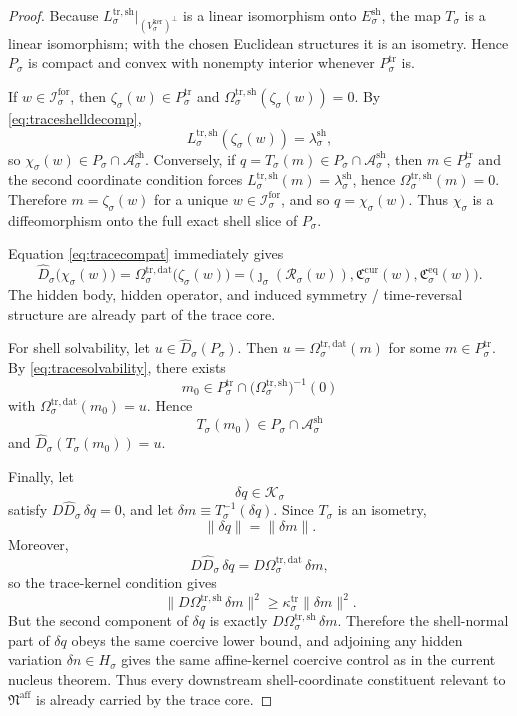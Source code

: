 \documentclass[11pt]{article}
\newcommand{\AffineNucleus}{\mathfrak N^{\mathrm{aff}}}
\newcommand{\ForSpace}[1]{\mathcal I_{#1}^{\mathrm{for}}}
\newcommand{\Reduction}[1]{\mathcal R_{#1}}
\newcommand{\CurrentCarrier}[1]{\mathfrak C_{#1}^{\mathrm{cur}}}
\newcommand{\EqCarrier}[1]{\mathfrak C_{#1}^{\mathrm{eq}}}
\newcommand{\GapSpace}[1]{H_{#1}}
\newcommand{\TraceBody}[1]{P_{#1}^{\mathrm{tr}}}
\newcommand{\TraceDataMap}[1]{\Omega_{#1}^{\mathrm{tr,dat}}}
\newcommand{\TraceShellMap}[1]{\Omega_{#1}^{\mathrm{tr,sh}}}
\newcommand{\TraceEmbed}[1]{\zeta_{#1}}
\newcommand{\TraceShellLin}[1]{L_{#1}^{\mathrm{tr,sh}}}
\newcommand{\ShellKer}[1]{V_{#1}^{\mathrm{ker}}}
\newcommand{\ShellNormal}[1]{E_{#1}^{\mathrm{sh}}}
\newcommand{\ShellOffset}[1]{\lambda_{#1}^{\mathrm{sh}}}
\newcommand{\CoordSpace}[1]{\mathcal K_{#1}}
\newcommand{\CoordBody}[1]{P_{#1}}
\newcommand{\CoordIso}[1]{T_{#1}}
\newcommand{\AffineData}[1]{\widehat D_{#1}}
\newcommand{\ShellAffine}[1]{\mathcal A_{#1}^{\mathrm{sh}}}
\newcommand{\ShellEmbed}[1]{\chi_{#1}}
\begin{document}
\begin{proof}
Because \(\TraceShellLin{\sigma}\big|_{(\ShellKer{\sigma})^{\perp}}\) is a linear isomorphism onto \(\ShellNormal{\sigma}\), the map \(\CoordIso{\sigma}\) is a linear isomorphism; with the chosen Euclidean structures it is an isometry. Hence \(\CoordBody{\sigma}\) is compact and convex with nonempty interior whenever \(\TraceBody{\sigma}\) is.

If \(w\in\ForSpace{\sigma}\), then \(\TraceEmbed{\sigma}(w)\in\TraceBody{\sigma}\) and \(\TraceShellMap{\sigma}(\TraceEmbed{\sigma}(w))=0\). By \eqref{eq:traceshelldecomp},
\[
\TraceShellLin{\sigma}(\TraceEmbed{\sigma}(w))
=
\ShellOffset{\sigma},
\]
so \(\ShellEmbed{\sigma}(w)\in\CoordBody{\sigma}\cap\ShellAffine{\sigma}\). Conversely, if \(q=\CoordIso{\sigma}(m)\in\CoordBody{\sigma}\cap\ShellAffine{\sigma}\), then \(m\in\TraceBody{\sigma}\) and the second coordinate condition forces \(\TraceShellLin{\sigma}(m)=\ShellOffset{\sigma}\), hence \(\TraceShellMap{\sigma}(m)=0\). Therefore \(m=\TraceEmbed{\sigma}(w)\) for a unique \(w\in\ForSpace{\sigma}\), and so \(q=\ShellEmbed{\sigma}(w)\). Thus \(\ShellEmbed{\sigma}\) is a diffeomorphism onto the full exact shell slice of \(\CoordBody{\sigma}\).

Equation \eqref{eq:tracecompat} immediately gives
\[
\AffineData{\sigma}\bigl(\ShellEmbed{\sigma}(w)\bigr)
=
\TraceDataMap{\sigma}\bigl(\TraceEmbed{\sigma}(w)\bigr)
=
\bigl(
\jmath_{\sigma}(\Reduction{\sigma}(w)),
\CurrentCarrier{\sigma}(w),
\EqCarrier{\sigma}(w)
\bigr).
\]
The hidden body, hidden operator, and induced symmetry / time-reversal structure are already part of the trace core.

For shell solvability, let \(u\in\AffineData{\sigma}(\CoordBody{\sigma})\). Then \(u=\TraceDataMap{\sigma}(m)\) for some \(m\in\TraceBody{\sigma}\). By \eqref{eq:tracesolvability}, there exists
\[
m_{0}\in\TraceBody{\sigma}\cap
\bigl(\TraceShellMap{\sigma}\bigr)^{-1}(0)
\]
with \(\TraceDataMap{\sigma}(m_{0})=u\). Hence
\[
\CoordIso{\sigma}(m_{0})\in\CoordBody{\sigma}\cap\ShellAffine{\sigma}
\]
and \(\AffineData{\sigma}(\CoordIso{\sigma}(m_{0}))=u\).

Finally, let
\[
\delta q\in\CoordSpace{\sigma}
\]
satisfy \(D\AffineData{\sigma}\,\delta q=0\), and let \(\delta m\equiv\CoordIso{\sigma}^{-1}(\delta q)\). Since \(\CoordIso{\sigma}\) is an isometry,
\[
\|\delta q\|=\|\delta m\|.
\]
Moreover,
\[
D\AffineData{\sigma}\,\delta q
=
D\TraceDataMap{\sigma}\,\delta m,
\]
so the trace-kernel condition gives
\[
\bigl\|
D\TraceShellMap{\sigma}\,\delta m
\bigr\|^{2}
\ge
\kappa_{\sigma}^{\mathrm{tr}}\|\delta m\|^{2}.
\]
But the second component of \(\delta q\) is exactly \(D\TraceShellMap{\sigma}\,\delta m\). Therefore the shell-normal part of \(\delta q\) obeys the same coercive lower bound, and adjoining any hidden variation \(\delta n\in\GapSpace{\sigma}\) gives the same affine-kernel coercive control as in the current nucleus theorem. Thus every downstream shell-coordinate constituent relevant to \(\AffineNucleus\) is already carried by the trace core.
\end{proof}
\end{document}
